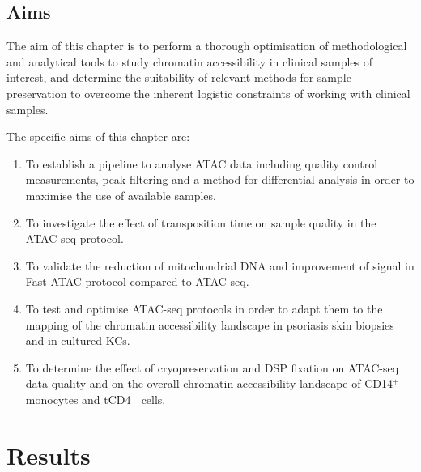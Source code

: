 \subsection{Aims}

The aim of this chapter is to perform a thorough optimisation of methodological and analytical tools to study chromatin accessibility in clinical samples of interest, and determine the suitability of relevant methods for sample preservation to overcome the inherent logistic constraints of working with clinical samples.
 
The specific aims of this chapter are:
 
\begin{enumerate}
\item To establish a pipeline to analyse ATAC data including quality control measurements, peak filtering and a method for differential analysis in order to maximise the use of available samples.
 
\item To investigate the effect of transposition time on sample quality in the ATAC-seq protocol.
 
\item To validate the reduction of mitochondrial DNA and improvement of signal in Fast-ATAC protocol compared to ATAC-seq.
 
\item To test and optimise ATAC-seq protocols in order to adapt them to the mapping of the chromatin accessibility landscape in psoriasis skin biopsies and in cultured KCs.

\item To determine the effect of cryopreservation and DSP fixation on ATAC-seq data quality and on the overall chromatin accessibility landscape of CD14$^+$ monocytes and tCD4$^+$ cells.
\end{enumerate}



\section{Results}
%

